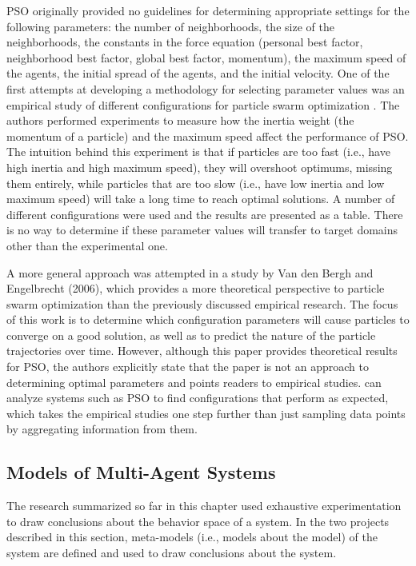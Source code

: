 PSO originally provided no guidelines for determining appropriate settings for the following parameters: the number of neighborhoods, the size of the neighborhoods, the constants in the force equation (personal best factor, neighborhood best factor, global best factor, momentum), the maximum speed of the agents, the initial spread of the agents, and the initial velocity.
One of the first attempts at developing a methodology for selecting parameter values was an empirical study of different configurations for particle swarm optimization \cite{shi1998parameter}.
The authors performed experiments to measure how the inertia weight (the momentum of a particle) and the maximum speed affect the performance of PSO.
The intuition behind this experiment is that if particles are too fast (i.e., have high inertia and high maximum speed), they will overshoot optimums, missing them entirely, while particles that are too slow (i.e., have low inertia and low maximum speed) will take a long time to reach optimal solutions.
A number of different configurations were used and the results are presented as a table.
There is no way to determine if these parameter values will transfer to target domains other than the experimental one.

A more general approach was attempted in a study by Van den Bergh and Engelbrecht (2006)\nocite{van2006study}, which provides a more theoretical perspective to particle swarm optimization than the previously discussed empirical research.
The focus of this work is to determine which configuration parameters will cause particles to converge on a good solution, as well as to predict the nature of the particle trajectories over time.
However, although this paper provides theoretical results for PSO, the authors explicitly state that the paper is not an approach to determining optimal parameters and points readers to empirical studies.
\fw can analyze systems such as PSO to find configurations that perform as expected, which takes the empirical studies one step further than just sampling data points by aggregating information from them.

\subsection{Models of Multi-Agent Systems}

The research summarized so far in this chapter used exhaustive experimentation to draw conclusions about the behavior space of a system.
In the two projects described in this section, meta-models (i.e., models about the model) of the system are defined and used to draw conclusions about the system.

